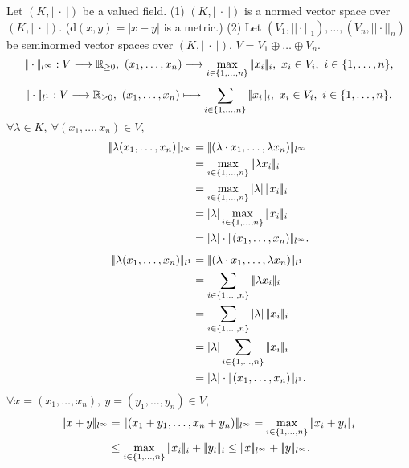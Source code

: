 \begin{exampleenv}
    Let $(K,\left|\ \cdot\ \right|)$ be a valued field.
    \newline
    (1) $(K,\left|\ \cdot\ \right|)$ is a normed vector space over $(K,\left|\ \cdot\ \right|)$. ($\mathrm{d}(x,y)=|x-y|$ is a metric.)
    \newline
    (2) Let $(V_1,|\!|\cdot|\!|_1),\dots, (V_n,|\!|\cdot|\!|_n)$ be seminormed vector spaces over $(K,\left|\ \cdot\ \right|)$, $V=V_1\oplus\dots\oplus V_n$.
    $$|\!|\cdot|\!|_{l^\infty}:V\longrightarrow \RR_{\ge0},\ (x_1,\dots,x_n)\longmapsto\max_{i\in\{1,\dots,n\}}|\!|x_i|\!|_{i},\ x_i\in V_i,\ i\in \{1,\dots,n\},$$
    $$|\!|\cdot|\!|_{l^1}:V\longrightarrow \RR_{\ge0},\ (x_1,\dots,x_n)\longmapsto\sum_{i\in\{1,\dots,n\}}|\!|x_i|\!|_{i},\ x_i\in V_i,\ i\in \{1,\dots,n\}.$$
    $\forall \lambda\in K, \ \forall (x_1,\dots,x_n)\in V,$ 
    \begin{align*}
        \pl \lambda(x_1,\dots,x_n)\pl_{l^\infty}&=\pl(\lambda\cdot x_1,\dots,\lambda x_n)\pl_{l^\infty}\\
        &=\max_{i\in\{1,\dots,n\}}\pl\lambda x_i\pl_i\\
        &=\max_{i\in\{1,\dots,n\}}\left|\lambda\right||\!| x_i|\!|_{i}\\
        &=|\lambda|\max_{i\in\{1,\dots,n\}}|\!|x_i|\!|_{i}\\
        &=|\lambda|\cdot |\!|(x_1,\dots,x_n)|\!|_{l^\infty}.
    \end{align*}
    \begin{align*}
        \pl \lambda(x_1,\dots,x_n)\pl_{l^1}&=\pl(\lambda\cdot x_1,\dots,\lambda x_n)\pl_{l^1}\\
        &=\sum_{i\in\{1,\dots,n\}}\pl\lambda x_i\pl_i\\
        &=\sum_{i\in\{1,\dots,n\}}\left|\lambda\right||\!| x_i|\!|_{i}\\
        &=|\lambda|\sum_{i\in\{1,\dots,n\}}|\!|x_i|\!|_{i}\\
        &=|\lambda|\cdot |\!|(x_1,\dots,x_n)|\!|_{l^1}.
    \end{align*}
    $\forall x=(x_1,\dots,x_n),\ y=(y_1,\dots,y_n)\in V$,
    \begin{align*}
        \pl x+y\pl_{l^\infty}&=\pl(x_1+y_1,\dots,x_n+y_n)\pl_{l^\infty}=\max_{i\in\{1,\dots,n\}}\pl x_i+y_i\pl_i\\
        &\le \max_{i\in\{1,\dots,n\}}\pl x_i\pl_i+\pl y_i\pl_i\le \pl x\pl_{l^\infty}+\pl y\pl_{l^\infty}.
    \end{align*}
    \begin{align*}

\end{align*}
\end{exampleenv}
